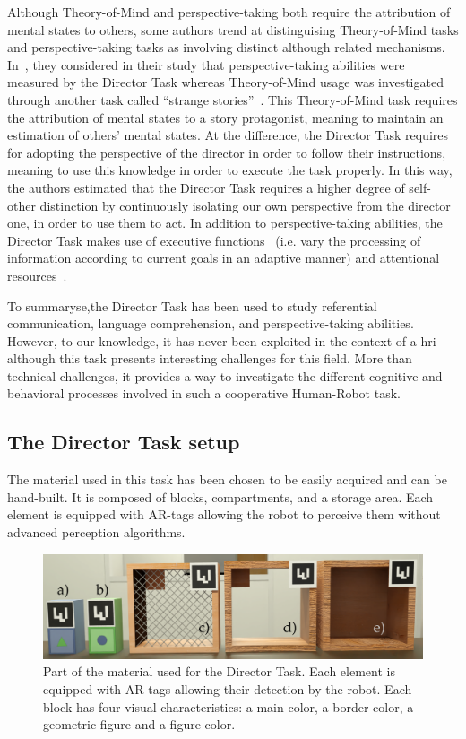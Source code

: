Although Theory-of-Mind and perspective-taking both require the attribution of mental states to others, some authors trend at distinguising Theory-of-Mind tasks and perspective-taking tasks as involving distinct although related mechanisms. In~\cite{santiesteban_2012_training}, they considered in their study that perspective-taking abilities were measured by the Director Task whereas Theory-of-Mind usage was investigated through another task called ``strange stories''~\cite{happe_1994_advanced}. This Theory-of-Mind task requires the attribution of mental states to a story protagonist, meaning to maintain an estimation of others' mental states. At the difference, the Director Task requires for adopting the perspective of the director in order to follow their instructions, meaning to use this knowledge in order to execute the task properly. 
In this way, the authors estimated that the Director Task requires a higher degree of self-other distinction by continuously isolating our own perspective from the director one, in order to use them to act. In addition to perspective-taking abilities, the Director Task makes use of executive functions~\cite{rubio_2017_director} (i.e. vary the processing of information according to current goals in an adaptive manner) and attentional resources~\cite{lin_2010_reflexively}.

To summaryse,the Director Task has been used to study referential communication, language comprehension, and perspective-taking abilities. However, to our knowledge, it has never been exploited in the context of a \acrshort{hri} although this task presents interesting challenges for this field. More than technical challenges, it provides a way to investigate the different cognitive and behavioral processes involved in such a cooperative Human-Robot task.

\subsection{The Director Task setup}

The material used in this task has been chosen to be easily acquired and can be hand-built. It is composed of blocks, compartments, and a storage area. Each element is equipped with AR-tags allowing the robot to perceive them without advanced perception algorithms.

\begin{figure}[ht!]
\centering
\includegraphics[width=\textwidth]{figures/chapter9/material.png}
\caption{\label{fig:chap9_material} Part of the material used for the Director Task. Each element is equipped with AR-tags allowing their detection by the robot. Each block has four visual characteristics: a main color, a border color, a geometric figure  and a figure color. }
\end{figure}


